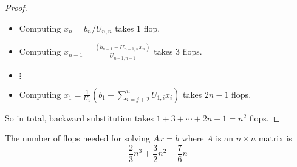 \begin{proof}
	\hfill
	\begin{itemize}
		\item Computing $x_n = b_n / U_{n, n}$ takes 1 flop.
		\item Computing $x_{n - 1} = \frac{(b_{n - 1} - U_{n - 1, n} x_n)}{U_{n - 1, n - 1}}$ takes 3 flops.
		\item $\vdots$
		\item Computing $x_1 = \frac{1}{U_1} \left( b_1 - \sum_{i = j + 2}^{n} U_{1, i} x_i \right)$ takes $2n - 1$ flops.
	\end{itemize}
	So in total, backward substitution takes $1 + 3 + \cdots + 2n - 1 = n^2$ flops.
\end{proof}

\begin{proposition}
	The number of flops needed for solving $Ax = b$ where $A$ is an $n \times n$ matrix is
	\[
		\frac{2}{3} n^3	+ \frac{3}{2} n^2 - \frac{7}{6} n
	\]
\end{proposition}

